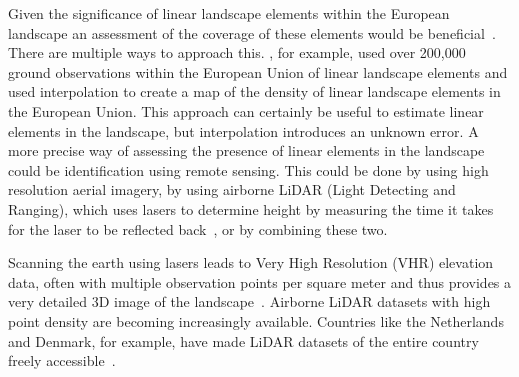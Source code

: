 Given the significance of linear landscape elements within the European landscape an assessment of the coverage of these elements would be beneficial~\citep{van2013modelling,bailly2008agrarian}. There are multiple ways to approach this. \citet{van2013modelling}, for example, used over 200,000 ground observations within the European Union of linear landscape elements and used interpolation to create a map of the density of linear landscape elements in the European Union. This approach can certainly be useful to estimate linear elements in the landscape, but interpolation introduces an unknown error. A more precise way of assessing the presence of linear elements in the landscape could be identification using remote sensing. This could be done by using high resolution aerial imagery, by using airborne LiDAR (Light Detecting and Ranging), which uses lasers to determine height by measuring the time it takes for the laser to be reflected back~\citep{lefsky2002lidar,lim2003lidar}, or by combining these two.

Scanning the earth using lasers leads to Very High Resolution (VHR) elevation data, often with multiple observation points per square meter and thus provides a very detailed 3D image of the landscape~\citep{lefsky2002lidar}. Airborne LiDAR datasets with high point density are becoming increasingly available. Countries like the Netherlands and Denmark, for example, have made LiDAR datasets of the entire country freely accessible~\citep{AHN2016inwinjaren, SDFE2017dhm}.

